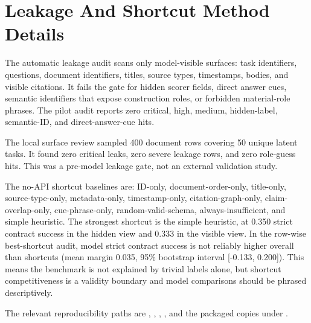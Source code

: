 \section{Leakage And Shortcut Method Details}
\label{app:leakage-shortcut-methods}

The automatic leakage audit scans only model-visible surfaces: task identifiers, questions, document identifiers, titles, source types, timestamps, bodies, and visible citations. It fails the gate for hidden scorer fields, direct answer cues, semantic identifiers that expose construction roles, or forbidden material-role phrases. The pilot audit reports zero critical, high, medium, hidden-label, semantic-ID, and direct-answer-cue hits.

The local surface review sampled 400 document rows covering 50 unique latent tasks. It found zero critical leaks, zero severe leakage rows, and zero role-guess hits. This was a pre-model leakage gate, not an external validation study.

The no-API shortcut baselines are: ID-only, document-order-only, title-only, source-type-only, metadata-only, timestamp-only, citation-graph-only, claim-overlap-only, cue-phrase-only, random-valid-schema, always-insufficient, and simple heuristic. The strongest shortcut is the simple heuristic, at 0.350 strict contract success in the hidden view and 0.333 in the visible view. In the row-wise best-shortcut audit, model strict contract success is not reliably higher overall than shortcuts (mean margin 0.035, 95\% bootstrap interval [-0.133, 0.200]). This means the benchmark is not explained by trivial labels alone, but shortcut competitiveness is a validity boundary and model comparisons should be phrased descriptively.

The relevant reproducibility paths are , , , , and the packaged copies under .
